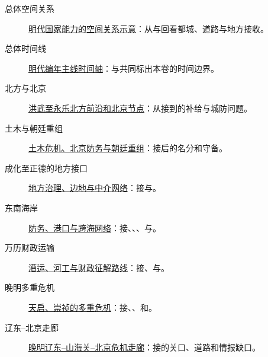 \begin{description}
  \item[总体空间关系] \hyperref[fig:vol05:ming-spatial-overview]{明代国家能力的空间关系示意}：从与回看都城、道路与地方接收。
  \item[总体时间线] \hyperref[fig:vol05:ming-chronology-timeline]{明代编年主线时间轴}：与共同标出本卷的时间边界。
  \item[北方与北京] \hyperref[fig:vol05:northern-frontier-beijing-grasslands]{洪武至永乐北方前沿和北京节点}：从接到的补给与城防问题。
  \item[土木与朝廷重组] \hyperref[fig:vol05:tumu-beijing-court-restoration]{土木危机、北京防务与朝廷重组}：接后的名分和守备。
  \item[成化至正德的地方接口] \hyperref[fig:vol05:regional-governance-frontiers]{地方治理、边地与中介网络}：接与。
  \item[东南海岸] \hyperref[fig:vol05:southeast-sea-coastal-networks]{防务、港口与跨海网络}：接、、、与。
  \item[万历财政运输] \hyperref[fig:vol05:transport-fiscal-routes]{漕运、河工与财政征解路线}：接、与。
  \item[晚明多重危机] \hyperref[fig:vol05:late-ming-crisis-multiple-fronts]{天启、崇祯的多重危机}：接、、和。
  \item[辽东--北京走廊] \hyperref[fig:vol05:liaodong-beijing-corridor]{晚明辽东--山海关--北京危机走廊}：接的关口、道路和情报缺口。
\end{description}
